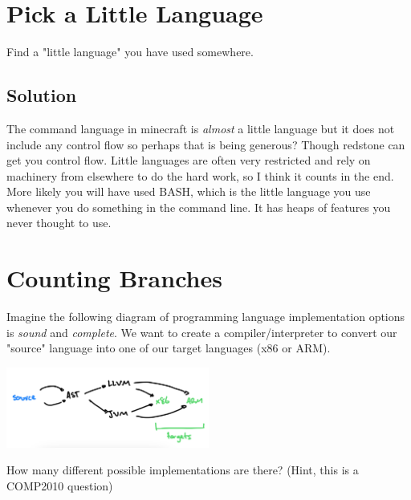 \documentclass[twoside=false, DIV=14]{scrartcl}
\begin{document}
\section*{Pick a Little Language}
Find a "little language" you have used somewhere.

\subsection*{Solution}
  The command language in minecraft is \emph{almost} a little language but it does not include any control flow so perhaps that is being generous?  Though redstone can get you control flow.  Little languages are often very restricted and rely on machinery from elsewhere to do the hard work, so I think it counts in the end.  More likely you will have used BASH, which is the little language you use whenever you do something in the command line.  It has heaps of features you never thought to use.

  \section*{Counting Branches}
Imagine the following diagram of programming language implementation options is \emph{sound} and \emph{complete}.  We want to create a compiler/interpreter to convert our "source" language into one of our target languages (x86 or ARM).
  
\includegraphics[width=0.5\textwidth]{2_paths.jpeg}

How many different possible implementations are there? (Hint, this is a COMP2010 question)
\end{document}
